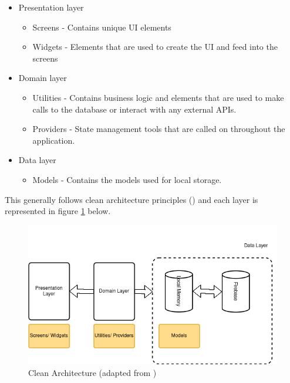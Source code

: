 \documentclass[12pt]{article}
\begin{document}
	\begin{itemize}
		\item Presentation layer
		\begin{itemize}
			\item Screens - Contains unique UI elements
			\item Widgets - Elements that are used to create the UI and feed into the screens
		\end{itemize}
	\end{itemize}
	
	\begin{itemize}
		\item Domain layer
		\begin{itemize}
			\item Utilities - Contains business logic and elements that are used to make calls to the database or interact with any external APIs.
			\item Providers - State management tools that are called on throughout the application.
		\end{itemize}
	\end{itemize}
	
	\begin{itemize}
		\item Data layer
		\begin{itemize}
			\item Models - Contains the models used for local storage.
		\end{itemize}
	\end{itemize}

	 This generally follows clean architecture principles (\cite{martinRapidApplicationDevelopment1991}) and each layer is represented in figure \ref{fig:clean-architecture} below.
	 
	 \begin{figure}[H]
	 	\centering
	 	\includegraphics[scale=0.7]{images/clean-architecture.png}
	 	\caption{Clean Architecture (adapted from \cite{martinRapidApplicationDevelopment1991})}
	 	\label{fig:clean-architecture}
	 \end{figure}
 
\end{document}
